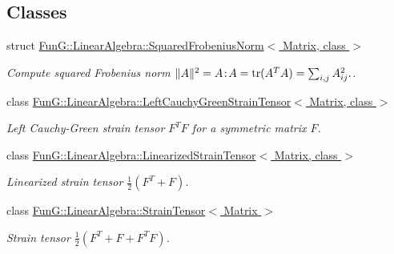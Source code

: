 \subsection*{Classes}
\begin{DoxyCompactItemize}
\item 
struct \hyperlink{structFunG_1_1LinearAlgebra_1_1SquaredFrobeniusNorm}{Fun\-G\-::\-Linear\-Algebra\-::\-Squared\-Frobenius\-Norm$<$ Matrix, class $>$}
\begin{DoxyCompactList}\small\item\em Compute squared Frobenius norm $ \|A\|^2 = A\negthinspace : \negthinspace A = \mathrm{tr}(A^TA) = \sum_{i,j} A_{ij}^2. $. \end{DoxyCompactList}\item 
class \hyperlink{classFunG_1_1LinearAlgebra_1_1LeftCauchyGreenStrainTensor}{Fun\-G\-::\-Linear\-Algebra\-::\-Left\-Cauchy\-Green\-Strain\-Tensor$<$ Matrix, class $>$}
\begin{DoxyCompactList}\small\item\em Left Cauchy-\/\-Green strain tensor $ F^T F $ for a symmetric matrix $ F $. \end{DoxyCompactList}\item 
class \hyperlink{classFunG_1_1LinearAlgebra_1_1LinearizedStrainTensor}{Fun\-G\-::\-Linear\-Algebra\-::\-Linearized\-Strain\-Tensor$<$ Matrix, class $>$}
\begin{DoxyCompactList}\small\item\em Linearized strain tensor $ \frac{1}{2}\left(F^T+F\right) $. \end{DoxyCompactList}\item 
class \hyperlink{classFunG_1_1LinearAlgebra_1_1StrainTensor}{Fun\-G\-::\-Linear\-Algebra\-::\-Strain\-Tensor$<$ Matrix $>$}
\begin{DoxyCompactList}\small\item\em Strain tensor $ \frac{1}{2}\left(F^T+F + F^T F\right) $. \end{DoxyCompactList}\end{DoxyCompactItemize}
